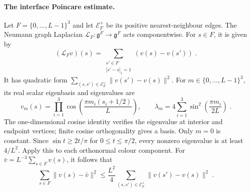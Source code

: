 \documentclass[11pt]{article}
\begin{document}
\paragraph{The interface Poincare estimate.}
Let $F=\{0,\ldots,L-1\}^3$ and let $\mathcal E_F^+$ be its positive nearest-neighbour edges. The Neumann graph Laplacian $\mathcal L_F \colon \mathfrak g^F \to \mathfrak g^F$ acts componentwise. For $s\in F$, it is given by
\begin{equation}\label{eq:direct-face-laplacian}
    (\mathcal L_Fv)(s)=
        \sum_{\substack{s'\in F\\ |s'-s|_1=1}}
            (v(s)-v(s'))\;.
\end{equation}
It has quadratic form $\sum_{(s,s')\in \mathcal E_F^+}\|v(s')-v(s)\|^2$. For $m\in \{0,\ldots,L-1\}^3$, its real scalar eigenbasis and eigenvalues are
\begin{equation}\label{eq:direct-face-spectrum}
    v_m(s)=\prod_{i=1}^3
        \cos\left(\frac{\pi m_i(s_i+1/2)}{L}\right),
    \qquad
    \lambda_m=4\sum_{i=1}^3
        \sin^2\left(\frac{\pi m_i}{2L}\right)\;.
\end{equation}
The one-dimensional cosine identity verifies the eigenvalue at interior and endpoint vertices; finite cosine orthogonality gives a basis. Only $m=0$ is constant. Since $\sin t\geq 2t/\pi$ for $0\leq t\leq \pi/2$, every nonzero eigenvalue is at least $4/L^2$. Apply this to each orthonormal colour component. For $\bar v=L^{-3}\sum_{s\in F}v(s)$, it follows that
\begin{equation}\label{eq:direct-face-poincare}
    \sum_{s\in F}\|v(s)-\bar v\|^2
        \leq \frac{L^2}{4}
            \sum_{(s,s')\in \mathcal E_F^+}
                \|v(s')-v(s)\|^2\;.
\end{equation}
\end{document}
